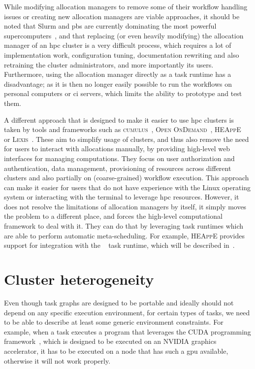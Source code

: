 While modifying allocation managers to remove some of their workflow handling issues or creating
new allocation managers are viable approaches, it should be noted that Slurm and
\gls{pbs} are currently dominating the most powerful
supercomputers~\cite{slurm-schedmd}, and that replacing (or even heavily modifying) the
allocation manager of an \gls{hpc} cluster is a very difficult process, which
requires a lot of implementation work, configuration tuning, documentation rewriting and also
retraining the cluster administrators, and more importantly its users. Furthermore, using the
allocation manager directly as a task runtime has a disadvantage; as it is then no longer easily
possible to run the workflows on personal computers or \gls{ci} servers, which
limits the ability to prototype and test them.

A different approach that is designed to make it easier to use \gls{hpc}
clusters is taken by tools and frameworks such as \textsc{cumulus}~\cite{cumulus}, \textsc{Open
OnDemand}~\cite{openondemand}, \textsc{HEAppE}~\cite{heappe} or \textsc{Lexis}~\cite{lexis}.
These aim to simplify usage of clusters, and thus also remove the need for users to interact
with allocations manually, by providing high-level web interfaces for managing
computations. They focus on user authorization and authentication, data management, provisioning of
resources across different clusters and also partially on (coarse-grained) workflow execution. This
approach can make it easier for users that do not have experience with the Linux operating system
or interacting with the terminal to leverage \gls{hpc} resources. However, it does not resolve
the limitations of allocation managers by itself, it simply moves the problem to a different
place, and forces the high-level computational framework to deal with it. They can do that
by leveraging task runtimes which are able to perform automatic meta-scheduling. For example,
\textsc{HEAppE} provides support for integration with the \hyperqueue{}~\cite{heappe_hq}
task runtime, which will be described in~.

\section{Cluster heterogeneity}
Even though task graphs are designed to be portable and ideally should not depend on any specific
execution environment, for certain types of tasks, we need to be able to describe at least some
generic environment constraints. For example, when a task executes a program that leverages the
CUDA programming framework~\cite{cuda}, which is designed to be executed on an
NVIDIA graphics accelerator, it has to be executed on a node that has such a
\gls{gpu} available, otherwise it will not work properly.

